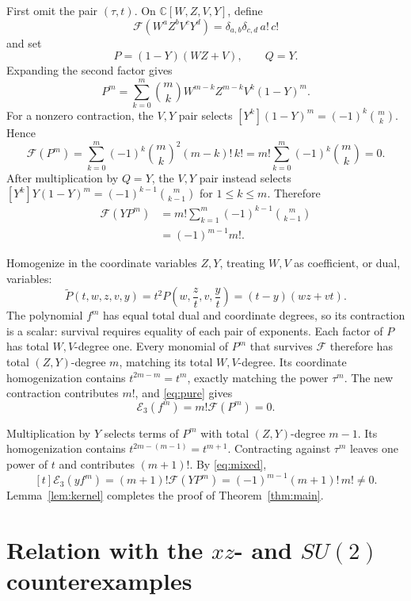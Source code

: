 \documentclass[11pt]{article}
\newcommand{\C}{\mathbb C}
\newcommand{\Eop}{\mathcal E}
\begin{document}
First omit the pair \((\tau,t)\).  On
\(\C[W,Z,V,Y]\), define
\[
 \mathcal F(W^aZ^bV^cY^d)
 =\delta_{a,b}\delta_{c,d}\,a!\,c!
\]
and set
\[
 P=(1-Y)(WZ+V),\qquad Q=Y.
\]
Expanding the second factor gives
\[
 P^m=\sum_{k=0}^m\binom mk
 W^{m-k}Z^{m-k}V^k(1-Y)^m.
\]
For a nonzero contraction, the \(V,Y\) pair selects
\([Y^k](1-Y)^m=(-1)^k\binom mk\).  Hence
\begin{equation}\label{eq:pure}
 \mathcal F(P^m)
 =\sum_{k=0}^m(-1)^k\binom mk^2(m-k)!\,k!
 =m!\sum_{k=0}^m(-1)^k\binom mk=0.
\end{equation}
After multiplication by \(Q=Y\), the \(V,Y\) pair instead selects
\([Y^k]Y(1-Y)^m=(-1)^{k-1}\binom m{k-1}\) for \(1\leq k\leq m\).
Therefore
\begin{equation}\label{eq:mixed}
 \begin{aligned}
 \mathcal F(YP^m)
 &=m!\sum_{k=1}^m(-1)^{k-1}\binom m{k-1}\\
 &=(-1)^{m-1}m!.
 \end{aligned}
\end{equation}

Homogenize in the coordinate variables \(Z,Y\), treating \(W,V\) as
coefficient, or dual, variables:
\[
 \widetilde P(t,w,z,v,y)
 =t^2P\left(w,\frac zt,v,\frac yt\right)
 =(t-y)(wz+vt).
\]
The polynomial \(f^m\) has equal total dual and coordinate degrees,
so its contraction is a scalar: survival requires equality of each pair
of exponents. Each factor of \(P\) has total \(W,V\)-degree one.  Every monomial of
\(P^m\) that survives \(\mathcal F\) therefore has total
\((Z,Y)\)-degree \(m\), matching its total \(W,V\)-degree.  Its
coordinate homogenization contains
\(t^{2m-m}=t^m\), exactly matching the power \(\tau^m\).
The new contraction contributes \(m!\), and
\eqref{eq:pure} gives
\[
 \Eop_3(f^m)=m!\mathcal F(P^m)=0.
\]

Multiplication by \(Y\) selects terms of \(P^m\) with total
\((Z,Y)\)-degree \(m-1\).  Its homogenization contains
\(t^{2m-(m-1)}=t^{m+1}\).  Contracting against \(\tau^m\)
leaves one power of \(t\) and contributes \((m+1)!\).  By
\eqref{eq:mixed},
\[
 [t]\Eop_3(yf^m)
 =(m+1)!\mathcal F(YP^m)
 =(-1)^{m-1}(m+1)!\,m!\neq0.
\]
Lemma~\ref{lem:kernel} completes the proof of
Theorem~\ref{thm:main}.

\section{Relation with the
  \texorpdfstring{\(xz\)- and \(SU(2)\)}{xz- and SU(2)} counterexamples}
\end{document}
